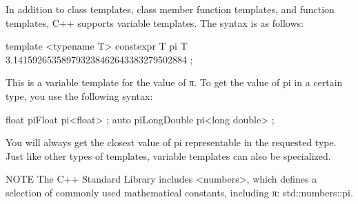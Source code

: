 
In addition to class templates, class member function templates, and function templates, C++ supports variable templates. The syntax is as follows:

\begin{cpp}
template <typename T>
constexpr T pi { T { 3.141592653589793238462643383279502884 } };
\end{cpp}

This is a variable template for the value of π. To get the value of pi in a certain type, you use the following syntax:

\begin{cpp}
float piFloat { pi<float> };
auto piLongDouble { pi<long double> };
\end{cpp}

You will always get the closest value of pi representable in the requested type. Just like other types of templates, variable templates can also be specialized.

\begin{myNotic}{NOTE}
The C++ Standard Library includes <numbers>, which defines a selection of commonly used mathematical constants, including π: std::numbers::pi.
\end{myNotic}














